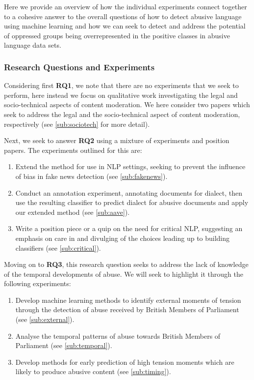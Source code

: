 Here we provide an overview of how the individual experiments connect together to a cohesive answer to the overall questions of how to detect abusive language using machine learning and how we can seek to detect and address the potential of oppressed groups being overrepresented in the positive classes in abusive language data sets.\vspace{5mm}

\subsubsection{Research Questions and Experiments}
Considering first {\bf RQ1}, we note that there are no experiments that we seek to perform, here instead we focus on qualitative work investigating the legal and socio-technical aspects of content moderation. We here consider two papers which seek to address the legal and the socio-technical aspect of content moderation, respectively (see \autoref{sub:sociotech} for more detail).\vspace{5mm}

Next, we seek to answer {\bf RQ2} using a mixture of experiments and position papers. The experiments outlined for this are:

\begin{enumerate}
  \item{Extend the \cite{Agarwal:2018} method for use in NLP settings, seeking to prevent the influence of bias in fake news detection (see \autoref{sub:fakenews}).}
  \item{Conduct an annotation experiment, annotating documents for dialect, then use the resulting classifier to predict dialect for abusive documents and apply our extended method (see \autoref{sub:aave}).}
  \item{Write a position piece or a quip on the need for critical NLP, suggesting an emphasis on care in and divulging of the choices leading up to building classifiers (see \autoref{sub:critical}).}
\end{enumerate}

Moving on to {\bf RQ3}, this research question seeks to address the lack of knowledge of the temporal developments of abuse. We will seek to highlight it through the following experiments:

\begin{enumerate}
  \item{Develop machine learning methods to identify external moments of tension through the detection of abuse received by British Members of Parliament (see \autoref{sub:external}).}
  \item{Analyse the temporal patterns of abuse towards British Members of Parliament (see \autoref{sub:temporal}).}
  \item{Develop methods for early prediction of high tension moments which are likely to produce abusive content (see \autoref{sub:timing}).}
\end{enumerate}

